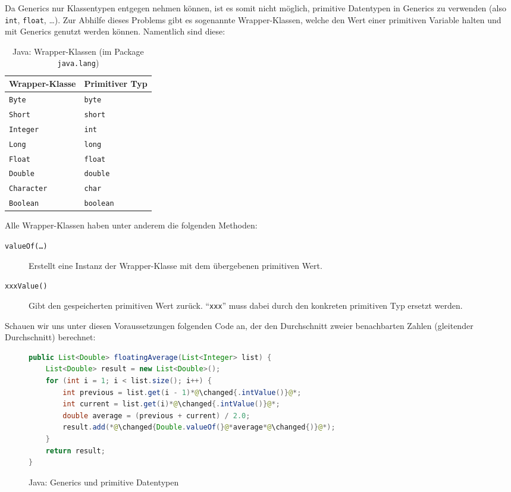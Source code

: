 		Da Generics nur Klassentypen entgegen nehmen können, ist es somit nicht möglich, primitive Datentypen in Generics zu verwenden (also \texttt{int}, \texttt{float}, \dots). Zur Abhilfe dieses Problems gibt es sogenannte Wrapper-Klassen, welche den Wert einer primitiven Variable halten und mit Generics genutzt werden können. Namentlich sind diese:
		\begin{table}[H]
			\centering
			\begin{tabular}{l | l}
				Wrapper-Klasse     & Primitiver Typ   \\ \hline
				\texttt{Byte}      & \texttt{byte}    \\
				\texttt{Short}     & \texttt{short}   \\
				\texttt{Integer}   & \texttt{int}     \\
				\texttt{Long}      & \texttt{long}    \\
				\texttt{Float}     & \texttt{float}   \\
				\texttt{Double}    & \texttt{double}  \\
				\texttt{Character} & \texttt{char}    \\
				\texttt{Boolean}   & \texttt{boolean}
			\end{tabular}
			\caption{Java: Wrapper-Klassen (im Package \texttt{java.lang})}
		\end{table}
		Alle Wrapper-Klassen haben unter anderem die folgenden Methoden:
		\begin{description}
			\item[\texttt{valueOf(\dots)}] Erstellt eine Instanz der Wrapper-Klasse mit dem übergebenen primitiven Wert.
			\item[\texttt{xxxValue()}]     Gibt den gespeicherten primitiven Wert zurück. \enquote{\texttt{xxx}} muss dabei durch den konkreten primitiven Typ ersetzt werden.
		\end{description}
		
		Schauen wir uns unter diesen Voraussetzungen folgenden Code an, der den Durchschnitt zweier benachbarten Zahlen (gleitender Durchschnitt) berechnet:
		\begin{figure}[H]
			\centering
			\begin{lstlisting}[language = Java]
public List<Double> floatingAverage(List<Integer> list) {
	List<Double> result = new List<Double>();
	for (int i = 1; i < list.size(); i++) {
		int previous = list.get(i - 1)*@\changed{.intValue()}@*;
		int current = list.get(i)*@\changed{.intValue()}@*;
		double average = (previous + current) / 2.0;
		result.add(*@\changed{Double.valueOf(}@*average*@\changed{)}@*);
	}
	return result;
}
			\end{lstlisting}
			\caption{Java: Generics und primitive Datentypen}
			\label{fig:java_generics_motivation_gen}
		\end{figure}
		
